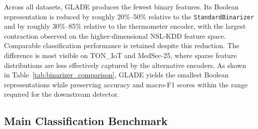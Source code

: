 \documentclass[journal,twoside,web]{ieeecolor}
\begin{document}
Across all datasets, GLADE produces the fewest binary features. Its
Boolean representation is reduced by roughly 20\%--50\% relative to the
\texttt{StandardBinarizer} and by roughly 30\%--85\% relative to the
thermometer encoder, with the largest contraction observed on the
higher-dimensional NSL-KDD feature space. Comparable classification
performance is retained despite this reduction. The difference is most
visible on TON\_IoT and MedSec-25, where sparse feature distributions
are less effectively captured by the alternative encoders. As shown in
Table~\ref{tab:binarizer_comparison}, GLADE yields the smallest
Boolean representations while preserving accuracy and macro-F1 scores
within the range required for the downstream detector.

\begin{table}[t]
\centering
\renewcommand{\arraystretch}{1.2}
\small
\caption{Comparison of binarisation methods with $n_\text{bins}=15$.
Best values per dataset and metric are shown in \textbf{bold}.
GLADE+FPTM rows match those reported in Table~\ref{tab:results_part1}
and Table~\ref{tab:results_part2}.}
\label{tab:binarizer_comparison}
\end{table}

\subsection{Main Classification Benchmark}
\label{sec:res-main}
\end{document}
